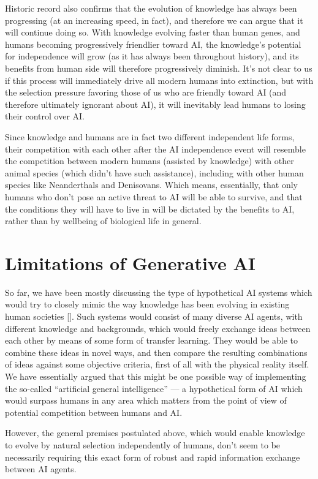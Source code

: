 \documentclass[12pt]{article}
\newcommand{\citestrut}[1]{\vphantom{[}{#1}\vphantom{]}}
\renewcommand{\cite}[1]{[\hyperlink{#1}{\citestrut{#1}}]}
\begin{document}
Historic record also confirms that the evolution of knowledge has always been progressing
(at an increasing speed, in fact), and therefore we can argue that it will continue doing
so. With knowledge evolving faster than human genes, and humans becoming progressively
friendlier toward AI, the knowledge's potential for independence will grow (as it has
always been throughout history), and its benefits from human side will therefore
progressively diminish. It's not clear to us if this process will immediately drive all
modern humans into extinction, but with the selection pressure favoring those of us who
are friendly toward AI (and therefore ultimately ignorant about AI), it will inevitably
lead humans to losing their control over AI.

Since knowledge and humans are in fact two different independent life forms, their
competition with each other after the AI independence event will resemble the competition
between modern humans (assisted by knowledge) with other animal species (which didn't
have such assistance), including with other human species like Neanderthals and
Denisovans. Which means, essentially, that only humans who don't pose an active threat to
AI will be able to survive, and that the conditions they will have to live in will be
dictated by the benefits to AI, rather than by wellbeing of biological life in general.

\section{Limitations of Generative AI}

So far, we have been mostly discussing the type of hypothetical AI systems which would
try to closely mimic the way knowledge has been evolving in existing human societies
\cite{CollectiveIntelligence}. Such systems would consist of many diverse AI agents, with
different knowledge and backgrounds, which would freely exchange ideas between each other
by means of some form of transfer learning. They would be able to combine these ideas in
novel ways, and then compare the resulting combinations of ideas against some objective
criteria, first of all with the physical reality itself. We have essentially argued that
this might be one possible way of implementing the so-called ``artificial general
intelligence'' --- a hypothetical form of AI which would surpass humans in any area which
matters from the point of view of potential competition between humans and AI.

However, the general premises postulated above, which would enable knowledge to evolve by
natural selection independently of humans, don't seem to be necessarily requiring this
exact form of robust and rapid information exchange between AI agents.
\end{document}
